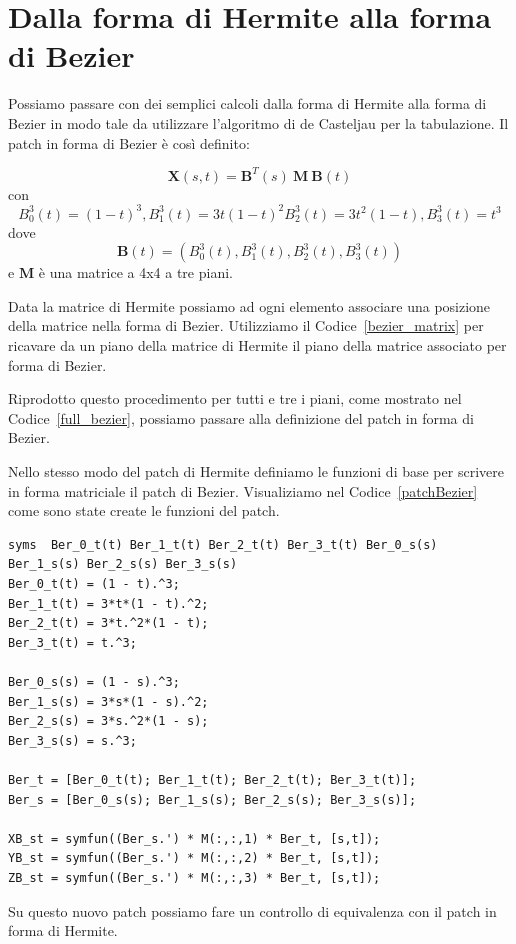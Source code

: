 \documentclass[12pt]{article}
\begin{document}
\section{Dalla forma di Hermite alla forma di Bezier}
Possiamo passare con dei semplici calcoli dalla forma di Hermite alla forma di Bezier
in modo tale da utilizzare l'algoritmo di de Casteljau per la tabulazione.
Il patch in forma di Bezier è così definito:

$$\mathbf{X}(s,t) = \mathbf{B}^T(s)\mathbf{\ M \ B}(t)$$
con\\
$$B^3_0(t) = (1 - t)^3, B^3_1(t) = 3t(1 - t)^2 B^3_2(t) = 3t^2(1 - t), B^3_3(t) = t^3$$
\noindent
dove
$$\mathbf{B}(t) = (B^3_0(t), B^3_1(t), B^3_2(t), B^3_3(t))$$
e $\mathbf{M}$ è una matrice a 4x4 a tre piani.

Data la matrice di Hermite possiamo ad ogni elemento associare una posizione della matrice 
nella forma di Bezier.
Utilizziamo il Codice~\ref{bezier_matrix} per ricavare da un piano della matrice di Hermite
il piano della matrice associato per forma di Bezier.

Riprodotto questo procedimento per tutti e tre i piani, come mostrato nel Codice~\ref{full_bezier}, possiamo
passare alla definizione del patch in forma di Bezier.

Nello stesso modo del patch di Hermite definiamo le funzioni di base per scrivere
in forma matriciale il patch di Bezier. 
Visualiziamo nel Codice~\ref{patchBezier} come sono state create le funzioni del patch.
\begin{lstlisting}[caption={Patch in forma di Bezier}, style=matlab, label={patchBezier}, captionpos=b]
syms  Ber_0_t(t) Ber_1_t(t) Ber_2_t(t) Ber_3_t(t) Ber_0_s(s) Ber_1_s(s) Ber_2_s(s) Ber_3_s(s)
Ber_0_t(t) = (1 - t).^3;
Ber_1_t(t) = 3*t*(1 - t).^2;
Ber_2_t(t) = 3*t.^2*(1 - t);
Ber_3_t(t) = t.^3;

Ber_0_s(s) = (1 - s).^3;
Ber_1_s(s) = 3*s*(1 - s).^2;
Ber_2_s(s) = 3*s.^2*(1 - s);
Ber_3_s(s) = s.^3;

Ber_t = [Ber_0_t(t); Ber_1_t(t); Ber_2_t(t); Ber_3_t(t)];
Ber_s = [Ber_0_s(s); Ber_1_s(s); Ber_2_s(s); Ber_3_s(s)];

XB_st = symfun((Ber_s.') * M(:,:,1) * Ber_t, [s,t]);
YB_st = symfun((Ber_s.') * M(:,:,2) * Ber_t, [s,t]);
ZB_st = symfun((Ber_s.') * M(:,:,3) * Ber_t, [s,t]);
\end{lstlisting}
Su questo nuovo patch possiamo fare un controllo di equivalenza con il patch in forma di Hermite.
\end{document}

